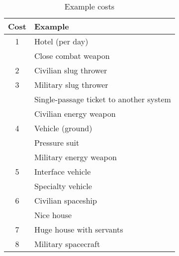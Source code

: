 \begin{wraptable}{r}[\sidebarwidth]{6.5cm}
\centering
\begin{tabular}{cp{}}
\toprule
Cost	& Example \\
\midrule 1
& Hotel (per day) \\
& Close combat weapon \\
\midrule 2
& Civilian slug thrower \\
\midrule 3
& Military slug thrower \\
& Single-passage ticket to another system \\
& Civilian energy weapon \\
\midrule 4
& Vehicle (ground) \\
& Pressure suit \\
& Military energy weapon \\
\midrule 5
& Interface vehicle \\
& Specialty vehicle \\
\midrule 6
& Civilian spaceship \\
& Nice house \\
\midrule 7
& Huge house with servants \\
\midrule 8
& Military spacecraft \\
\bottomrule
\end{tabular}
\caption{Example costs}
\label{tab:example-costs}
\end{wraptable}
